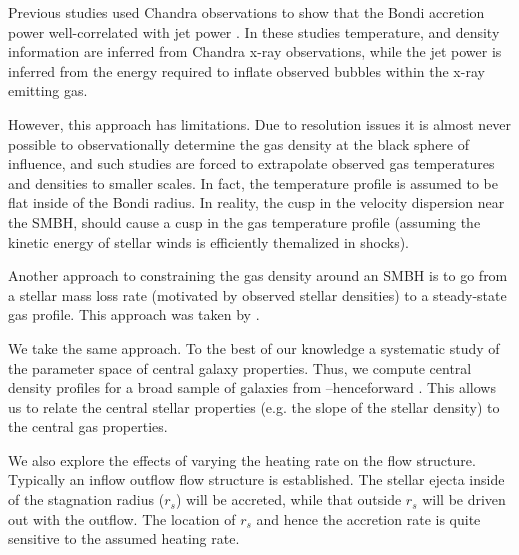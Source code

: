 \documentclass[usenatbib,fleqn]{mn2e}
\newcommand{\rs}{r_s}
\newcommand{\soi}{\rm soi}
\newcommand{\rsoi}{r_{\soi}}
\begin{document}
Previous studies used Chandra observations to show that the Bondi accretion power well-correlated with jet power \citep{AllenDunn+:2006a,FujitaKawakatu+:2014a}. In these studies temperature, and density information are inferred from Chandra x-ray observations, while the jet power is inferred from the energy required to inflate observed bubbles within the x-ray emitting gas. 

However, this approach has limitations. Due to resolution issues it is almost never possible to observationally determine the gas density at the black sphere of influence, and such studies are forced to extrapolate observed gas temperatures and densities to smaller scales.  In fact, the temperature profile is assumed to be flat inside of the Bondi radius.  In reality, the cusp in the velocity dispersion near the SMBH, should cause a cusp in the gas temperature profile (assuming the kinetic energy of stellar winds is efficiently themalized in shocks). 

Another approach to constraining the gas density around an SMBH is to go from a stellar mass loss rate (motivated by observed stellar densities) to a steady-state gas profile. This approach was taken by \citealt{Quataert:2004a,De-ColleGuillochon+:2012a,ShcherbakovWong+:2014a}. 

We take the same approach. To the best of our knowledge a systematic study of the parameter space of central galaxy properties. Thus, we compute central density profiles for a broad sample of galaxies from \citealt{WangMerritt:2004a}--henceforward .  This allows us to relate the central stellar properties (e.g. the slope of the stellar density) to the central gas properties. 

We also explore the effects of varying the heating rate on the flow structure. Typically an inflow outflow flow structure is established. The stellar ejecta inside of the stagnation radius ($\rs$) will be accreted, while that outside $\rs$ will be driven out with the outflow. The location of $\rs$ and hence the accretion rate is  quite sensitive to the assumed heating rate.  
\end{document}
